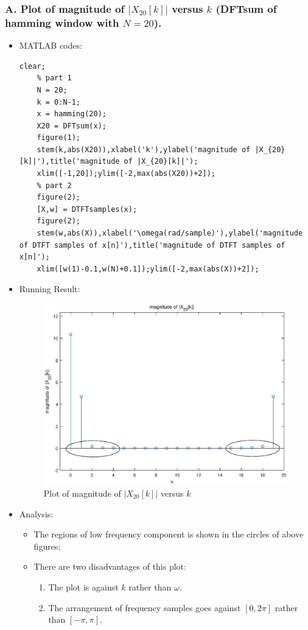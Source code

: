 \documentclass[onecolumn,oneside]{SUSTechHomework}
\begin{document}
\subsubsection*{A. Plot of magnitude of $|X_{20}[k]|$ versus $k$ (DFTsum of hamming window with $N=20$).}
\begin{itemize}
	\item MATLAB codes:
\begin{lstlisting}[title=\textbf{q5\_2\_1.m}]
	clear;
	% part 1
	N = 20;
	k = 0:N-1;
	x = hamming(20);
	X20 = DFTsum(x);
	figure(1);
	stem(k,abs(X20)),xlabel('k'),ylabel('magnitude of |X_{20}[k]|'),title('magnitude of |X_{20}[k]|');
	xlim([-1,20]);ylim([-2,max(abs(X20))+2]);
	% part 2
	figure(2);
	[X,w] = DTFTsamples(x);
	figure(2);
	stem(w,abs(X)),xlabel('\omega(rad/sample)'),ylabel('magnitude of DTFT samples of x[n]'),title('magnitude of DTFT samples of x[n]');
	xlim([w(1)-0.1,w(N)+0.1]);ylim([-2,max(abs(X))+2]);
\end{lstlisting}
	\item Running Result:
\begin{figure}[H]
	\centering
	\includegraphics[width=150mm]{pictures/X20k.eps}
	\caption{Plot of magnitude of $|X_{20}[k]|$ versus $k$}
\end{figure}
	\item Analysis:
	\begin{itemize}
		\item The regions of low frequency component is shown in the circles of above figures;
		\item There are two disadvantages of this plot:
		\begin{enumerate}
			\item The plot is against $k$ rather than $\omega$.
			\item The arrangement of frequency samples goes against $[0,2\pi]$ rather than $[-\pi,\pi]$.
		\end{enumerate}
	\end{itemize}
\end{itemize}
\end{document}

